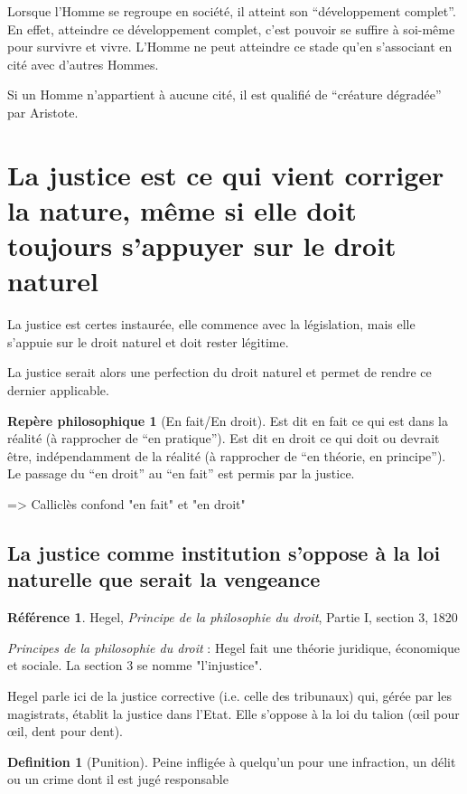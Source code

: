 \documentclass[french]{book}
\theoremstyle{definition}
\newtheorem*{dfn}{Definition}
\newtheorem*{refe}{Référence}
\newtheorem*{rep}{Repère philosophique}
\begin{document}
Lorsque l’Homme se regroupe en société, il atteint son “développement complet”. En effet, atteindre ce développement complet, c’est pouvoir se suffire à soi-même pour survivre et vivre. L’Homme ne peut atteindre ce stade qu’en s’associant en cité avec d’autres Hommes.

Si un Homme n’appartient à aucune cité, il est qualifié de “créature dégradée” par Aristote.

\section{La justice est ce qui vient corriger la nature, même si elle doit toujours s’appuyer sur le droit naturel}

La justice est certes instaurée, elle commence avec la législation, mais elle s’appuie sur le droit naturel et doit rester légitime.

La justice serait alors une perfection du droit naturel et permet de rendre ce dernier applicable.

\begin{rep}[En fait/En droit]
Est dit en fait ce qui est dans la réalité (à rapprocher de “en pratique”).
Est dit en droit ce qui doit ou devrait être, indépendamment de la réalité (à rapprocher de “en théorie, en principe”).
Le passage du “en droit” au “en fait” est permis par la justice.
\end{rep}

=> Calliclès confond "en fait" et "en droit"

\subsection{La justice comme institution s’oppose à la loi naturelle que serait la vengeance}

\begin{refe}
	Hegel, \textit{Principe de la philosophie du droit}, Partie I, section 3, 1820
\end{refe}

\textit{Principes de la philosophie du droit} : Hegel fait une théorie juridique, économique et sociale. La section 3 se nomme "l'injustice".

Hegel parle ici de la justice corrective (i.e. celle des tribunaux) qui, gérée par les magistrats, établit la justice dans l’Etat. Elle s’oppose à la loi du talion (œil pour œil, dent pour dent).

\begin{dfn}[Punition]
Peine infligée à quelqu’un pour une infraction, un délit ou un crime dont il est jugé responsable
\end{dfn}
\end{document}
